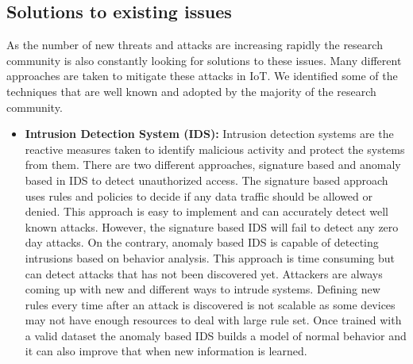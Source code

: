 \documentclass[letterpaper, 10 pt, conference]{ieeeconf}  %
\begin{document}
\subsection{Solutions to existing issues}
As the number of new threats and attacks are increasing rapidly the research community is also constantly looking for solutions to these issues. Many different approaches are taken to mitigate these attacks in IoT. We identified some of the techniques that are well known and adopted by the majority of the research community.
\begin{itemize}
\item \textbf{Intrusion Detection System (IDS):} Intrusion detection systems are the reactive measures taken to identify malicious activity and protect the systems from them. There are two different approaches, signature based and anomaly based in IDS to detect unauthorized access. The signature based approach uses rules and policies to decide if any data traffic should be allowed or denied. This approach is easy to implement and can accurately detect well known attacks. However, the signature based IDS will fail to detect any zero day attacks. On the contrary, anomaly based IDS is capable of detecting intrusions based on behavior analysis. This approach is time consuming but can detect attacks that has not been discovered yet. Attackers are always coming up with new and different ways to intrude systems. Defining new rules every time after an attack is discovered is not scalable as some devices may not have enough resources to deal with large rule set. Once trained with a valid dataset the anomaly based IDS builds a model of normal behavior and it can also improve that when new information is learned. 


\end{itemize}
\end{document}
